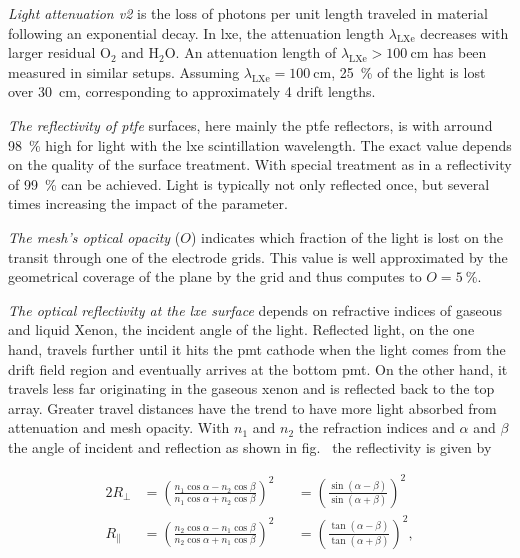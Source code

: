 \emph{Light attenuation v2} is the loss of photons per unit length traveled in material following an exponential decay.
In \gls{lxe}, the attenuation length $ \lambda_\mathrm{LXe} $ decreases with larger residual $ \mathrm{O}_2 $ and $ \mathrm{H}_2\mathrm{O} $.
An attenuation length of $ \lambda_\mathrm{LXe} > \SI{100}{\centi\m} $ has been measured in similar setups\cite{}.  %
Assuming $ \lambda_\mathrm{LXe} = \SI{100}{\centi\m} $, \SI{25}{\%} of the light is lost over \SI{30}{\centi\m}, corresponding to approximately 4 drift lengths.


\emph{The reflectivity of \gls{ptfe}} surfaces, here mainly the \gls{ptfe} reflectors, is with arround \SI{98}{\%} high for light with the \gls{lxe} scintillation wavelength.
The exact value depends on the quality of the surface treatment.
With special treatment as in \oneton a reflectivity of \SI{99}{\%} can be achieved\cite{}. %
Light is typically not only reflected once, but several times increasing the impact of the parameter.


\emph{The mesh's optical opacity} ($ O $) indicates which fraction of the light is lost on the transit through one of the electrode grids.
This value is well approximated by the geometrical coverage of the plane by the grid and thus computes to $ O = \SI{5}{\%} $.


\emph{The optical reflectivity at the \gls{lxe} surface} depends on refractive indices of gaseous and liquid Xenon, the incident angle of the light.
Reflected light, on the one hand, travels further until it hits the \gls{pmt} cathode when the light comes from the drift field region and eventually arrives at the bottom \gls{pmt}.
On the other hand, it travels less far originating in the gaseous xenon and is reflected back to the top array.
Greater travel distances have the trend to have more light absorbed from attenuation and mesh opacity.
With $ n_1 $ and $ n_2 $ the refraction indices and $ \alpha $ and $ \beta $ the angle of incident and reflection as shown in fig.~%
the reflectivity is given by

\begin{alignat}{2}
    R_\perp &= \left( \frac{ n_1 \cos{\alpha} - n_2 \cos{\beta} }{ n_1 \cos{\alpha} + n_2 \cos{\beta} } \right)^2 &
            &=  \left( \frac{ \sin{\left( \alpha-\beta \right)}}{ \sin{\left( \alpha+\beta \right)} } \right)^2 \\
    R_\parallel &= \left( \frac{ n_2 \cos{\alpha} - n_1 \cos{\beta} }{ n_2 \cos{\alpha} + n_1 \cos{\beta} } \right)^2 &
                &=  \left( \frac{ \tan{\left( \alpha-\beta \right)}}{ \tan{\left( \alpha+\beta \right)} } \right)^2,
\end{alignat}

